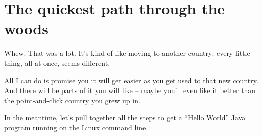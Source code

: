 \section{The quickest path through the woods}

Whew. That was a lot. It's kind of like moving to another country: every
little thing, all at once, seems different.

All I can do is promise you it will get easier as you get used to that new
country. And there will be parts of it you will like -- maybe you'll even like
it better than the point-and-click country you grew up in.

In the meantime, let's pull together all the steps to get a ``Hello World''
Java program running on the Linux command line.

